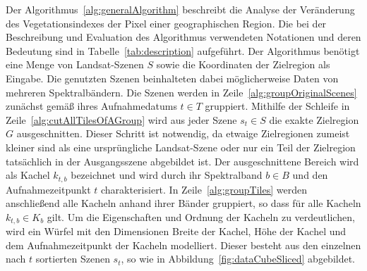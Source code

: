 Der Algorithmus~\ref{alg:generalAlgorithm} beschreibt die Analyse der Veränderung des Vegetationsindexes der Pixel einer geographischen Region. Die bei der Beschreibung und Evaluation des Algorithmus verwendeten Notationen und deren Bedeutung sind in Tabelle~\ref{tab:description} aufgeführt. Der Algorithmus benötigt eine Menge von Landsat-Szenen $S$ sowie die Koordinaten der Zielregion als Eingabe. Die genutzten Szenen beinhalteten dabei möglicherweise Daten von mehreren Spektralbändern. Die Szenen werden in Zeile~\ref{alg:groupOriginalScenes} zunächst gemäß ihres Aufnahmedatums $t \in T$ gruppiert. Mithilfe der Schleife in Zeile~\ref{alg:cutAllTilesOfAGroup} wird aus jeder Szene $s_t \in S$ die exakte Zielregion $G$ ausgeschnitten. Dieser Schritt ist notwendig, da etwaige Zielregionen zumeist kleiner sind als eine ursprüngliche Landsat-Szene oder nur ein Teil der Zielregion tatsächlich in der Ausgangsszene abgebildet ist. Der ausgeschnittene Bereich wird als Kachel $k_{t, b}$ bezeichnet und wird durch ihr Spektralband $b \in B$ und den Aufnahmezeitpunkt $t$ charakterisiert. In Zeile~\ref{alg:groupTiles} werden anschließend alle Kacheln anhand ihrer Bänder gruppiert, so dass für alle Kacheln $k_{t, b} \in K_{b}$ gilt. Um die Eigenschaften und Ordnung der Kacheln zu verdeutlichen, wird ein Würfel mit den Dimensionen Breite der Kachel, Höhe der Kachel und dem Aufnahmezeitpunkt der Kacheln modelliert. Dieser besteht aus den einzelnen nach $t$ sortierten Szenen $s_t$, so wie in Abbildung~\ref{fig:dataCubeSliced} abgebildet. 

